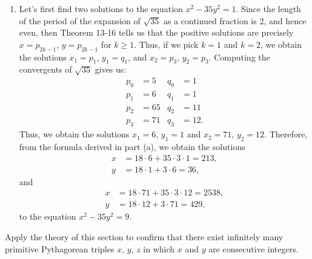\begin{solution}
\begin{enumerate}
        \begin{align*}
            x &= 16\cdot 8 + 7\cdot 6\cdot 3 = 254, \\
            y &= 16\cdot 3 + 6\cdot 8 = 96,
        \end{align*}
        and
        \begin{align*}
            x &= 16\cdot 127 + 7\cdot 6\cdot 48 = 4048, \\
            y &= 16\cdot 48 + 6\cdot 127 = 1530,
        \end{align*}
        to the equation $x^2 - 7y^2 = 4$.
        \item Let's first find two solutions to the equation $x^2 - 35y^2 = 1$. Since the length of the period of the expansion of $\sqrt{35}$ as a continued fraction is 2, and hence even, then Theorem 13-16 tells us that the positive solutions are precisely $x = p_{2k-1}$, $y = p_{2k-1}$ for $k \geq 1$. Thus, if we pick $k = 1$ and $k = 2$, we obtain the solutions $x_1 = p_1$, $y_1 = q_1$, and $x_2 = p_3$, $y_2 = p_3$. Computing the convergents of $\sqrt{35}$ gives us:
        \begin{align*}
            p_0 &= 5 & q_0 &= 1 \\
            p_1 &= 6 & q_1 &= 1  \\
            p_2 &= 65 & q_2 &= 11 \\
            p_3 &= 71 & q_3 &= 12.
        \end{align*}
        Thus, we obtain the solutions $x_1 = 6$, $y_1 = 1$ and $x_2 = 71$, $y_2 = 12$. Therefore, from the formula derived in part (a), we obtain the solutions
        \begin{align*}
            x &= 18\cdot 6 + 35\cdot 3\cdot 1 = 213, \\
            y &= 18\cdot 1 + 3\cdot 6 = 36,
        \end{align*}
        and
        \begin{align*}
            x &= 18\cdot 71 + 35\cdot 3\cdot 12 = 2538, \\
            y &= 18\cdot 12 + 3\cdot 71 = 429,
        \end{align*}
        to the equation $x^2 - 35y^2 = 9$. \\
    \end{enumerate}
\end{solution}

\begin{exercise}
    Apply the theory of this section to confirm that there exist infinitely many primitive Pythagorean triples $x$, $y$, $z$ in which $x$ and $y$ are consecutive integers. \\
\end{exercise}

